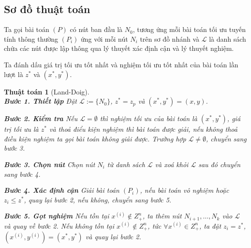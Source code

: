\documentclass[12pt,a4paper]{report}
\newtheorem{ttoan}{Thuật toán}
\begin{document}
\subsection*{Sơ đồ thuật toán}
Ta gọi bài toán $(P)$ có nút ban đầu là $N_0$, tương ứng mỗi bài toán tối ưu tuyến tính thông thường $(P_i)$ ứng với mỗi nút $N_i$ trên sơ đồ nhánh và $\mathcal{L}$ là danh sách chứa các nút được lập thông qua lý thuyết xác định cận và lý thuyết nghiệm.

Ta đánh dấu giá trị tối ưu tốt nhất và nghiệm tối ưu tốt nhất của bài toán lần lượt là $z^*$ và $(x^*,y^*)$.

\begin{ttoan}[Land-Doig]
\setlength{\parindent}{4em}
\noindent \\
\noindent \textbf{Bước 1. Thiết lập}
Đặt $\mathcal{L}:=\{N_0 \}$, $z^*=z_p$ và $(x^*,y^*)=(x,y)$. 

\noindent \textbf{Bước 2. Kiểm tra} 
Nếu $\mathcal{L} = \emptyset$ thì nghiệm tối ưu của bài toán là $(x^*,y^*)$, giá trị  tối ưu là $z^*$ và thoả điểu kiện nghiệm thì bài toán được giải, nếu không thoả điều kiện nghiệm ta gọi bài toán không giải được. 
Trường hợp $\mathcal{L} \neq \emptyset$, chuyển sang bước 3.

\noindent \textbf{Bước 3. Chọn nút} 
Chọn nút $N_i$ từ danh sách $\mathcal{L}$ và xoá khỏi $\mathcal{L}$ sau đó chuyển sang  bước 4. 

\noindent \textbf{Bước 4. Xác định cận}  
Giải bài toán $(P_i)$, nếu bài toán vô nghiệm hoặc $z_i \leq z^*$, quay  lại bước 2, nếu không, chuyển sang bước 5.

\noindent \textbf{Bước 5. Gọt nghiệm} 
Nếu tồn tại $x^{(i)} \notin Z^n_+$, ta thêm nút $N_{i+1}, \ldots , N_{k}$ vào $\mathcal{L}$ và quay  về bước 2. 
Nếu không tồn tại $x^{(i)} \notin Z^n_+$, tức $\forall x^{(i)} \in Z^n_+$, ta đặt $z_i = z^*$,  $(x^{(i)},y^{(i)}) = (x^*,y^*)$ và quay lại bước 2.
\end{ttoan}
\end{document}
